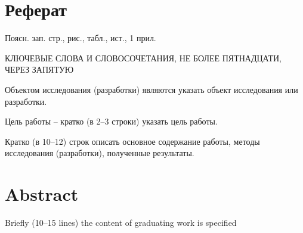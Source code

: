 \documentclass[../main]{subfiles}
\begin{document}
\newpage
{}
\section*{Реферат}
Поясн. зап.  стр.,   рис.,  табл.,  ист., 1 прил.

{   
    \jj\parindent=12.5mm
    \par
    \MakeUppercase{ключевые слова и словосочетания, не более пятнадцати, через запятую}
    \par
}

Объектом  исследования (разработки) являются указать объект исследования или разработки.

Цель работы -- кратко (в 2--3 строки) указать цель работы.

Кратко (в 10--12) строк описать основное содержание работы, методы исследования (разработки), полученные результаты.

\vspace{1cm}
\section*{Abstract}
Briefly (10--15 lines) the content of graduating work is specified
\end{document}
